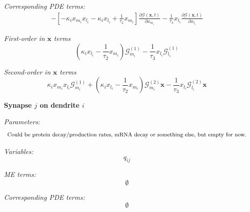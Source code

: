 \documentclass[a4paper, 11pt]{article}
\begin{document}
              {\it Corresponding PDE terms:}
              \begin{equation}
                \begin{split}
                  -\left[-\kappa_ix_{m_i}x_{l_i} - \kappa_ix_{l_i} + \frac{1}{\tau_2}x_{m_i}\right]\frac{\partial \mathcal G(\mathbf x, t)}{\partial x_{m_i}} - \frac{1}{\tau_3}x_{l_i}\frac{\partial\mathcal G(\mathbf x, t)}{\partial x_{l_i}}
                \end{split}
              \end{equation}

              {\it First-order in $\mathbf x$ terms}
              \begin{equation*}
                \left(\kappa_ix_{l_i}-\frac{1}{\tau_2}x_{m_i}\right)\mathcal G^{(1)}_{m_i} - \frac{1}{\tau_3}x_{l_i}\mathcal G^{(1)}_{l_i}
              \end{equation*}
              
              {\it Second-order in $\mathbf x$ terms}
              \begin{equation*}
                \kappa_ix_{m_i}x_{l_i}\mathcal G^{(1)}_{m_i} + \left(\kappa_ix_{l_i} - \frac{1}{\tau_2}x_{m_i}\right)\boldsymbol{\mathcal G}^{(2)}_{m_i}\mathbf x - \frac{1}{\tau_3}x_{l_i}\boldsymbol{\mathcal G}^{(2)}_{l_i}\mathbf x
              \end{equation*}

              {\bf Synapse $j$ on dendrite $i$}

              {\it Parameters:}
              \begin{equation*}
                \text{\footnotesize{Could be protein decay/production rates, mRNA decay or something else, but empty for now.}}
              \end{equation*}

              {\it Variables:}
              \begin{equation*}
                q_{ij}
              \end{equation*}

              
              {\it ME terms:}
              \begin{equation}
                \emptyset
              \end{equation}
              
              {\it Corresponding PDE terms:}
              \begin{equation}
                \emptyset
              \end{equation}
\end{document}
